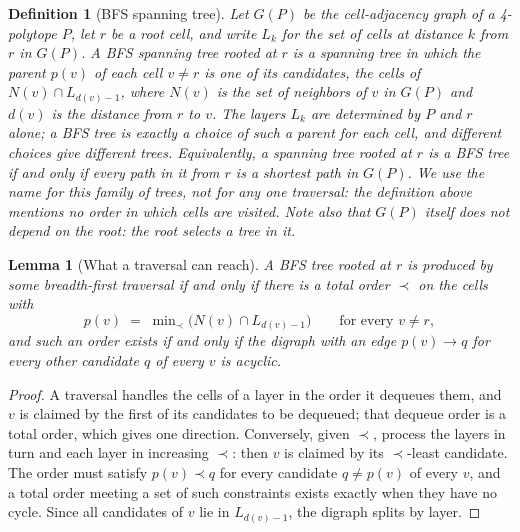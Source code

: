 \documentclass[11pt,letterpaper]{article}
\newtheorem{lemma}[theorem]{Lemma}
\newtheorem{definition}{Definition}
\begin{document}
\begin{definition}[BFS spanning tree]\label{def:bfs}
Let $G(P)$ be the cell-adjacency graph of a 4-polytope $P$, let $r$ be
a root cell, and write $L_k$ for the set of cells at distance $k$ from
$r$ in $G(P)$.
A \emph{BFS spanning tree} rooted at $r$ is a spanning tree in which
the parent $p(v)$ of each cell $v\neq r$ is one of its
\emph{candidates}, the cells of $N(v)\cap L_{d(v)-1}$, where $N(v)$ is
the set of neighbors of $v$ in $G(P)$ and $d(v)$ is the distance from
$r$ to $v$.
The layers $L_k$ are determined by $P$ and $r$ alone; a BFS tree is
exactly a choice of such a parent for each cell, and different choices
give different trees.
Equivalently, a spanning tree rooted at $r$ is a BFS tree if and only
if every path in it from $r$ is a shortest path in $G(P)$.
We use the name for this family of trees, not for any one traversal:
the definition above mentions no order in which cells are visited.
Note also that $G(P)$ itself does not depend on the root: the root
selects a tree in it.
\end{definition}

\begin{lemma}[What a traversal can reach]\label{lem:reach}
A BFS tree rooted at $r$ is produced by some breadth-first traversal if
and only if there is a total order $\prec$ on the cells with
\[
  p(v)\;=\;\min\nolimits_{\prec}\bigl(N(v)\cap L_{d(v)-1}\bigr)
  \qquad\text{for every } v\neq r ,
\]
and such an order exists if and only if the digraph with an edge
$p(v)\to q$ for every other candidate $q$ of every $v$ is acyclic.
\end{lemma}

\begin{proof}
A traversal handles the cells of a layer in the order it dequeues them,
and $v$ is claimed by the first of its candidates to be dequeued; that
dequeue order is a total order, which gives one direction.
Conversely, given $\prec$, process the layers in turn and each layer in
increasing $\prec$: then $v$ is claimed by its $\prec$-least candidate.
The order must satisfy $p(v)\prec q$ for every candidate $q\neq p(v)$
of every $v$, and a total order meeting a set of such constraints
exists exactly when they have no cycle.
Since all candidates of $v$ lie in $L_{d(v)-1}$, the digraph splits by
layer.
\end{proof}
\end{document}
